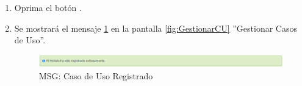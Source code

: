 \begin{enumerate}
			\item Oprima el botón \IUAceptar.
			
			\item Se mostrará el mensaje \ref{fig:CURegistrado} en la pantalla \ref{fig:GestionarCU} ''Gestionar Casos de Uso''.
			
			\begin{figure}[htbp!]
				\begin{center}
					\includegraphics[scale=0.6]{roles/lider/casosUso/pantallas/IU5-1MSG1}
					\caption{MSG: Caso de Uso Registrado}
					\label{fig:CURegistrado}
				\end{center}
			\end{figure}
			\end{enumerate}
